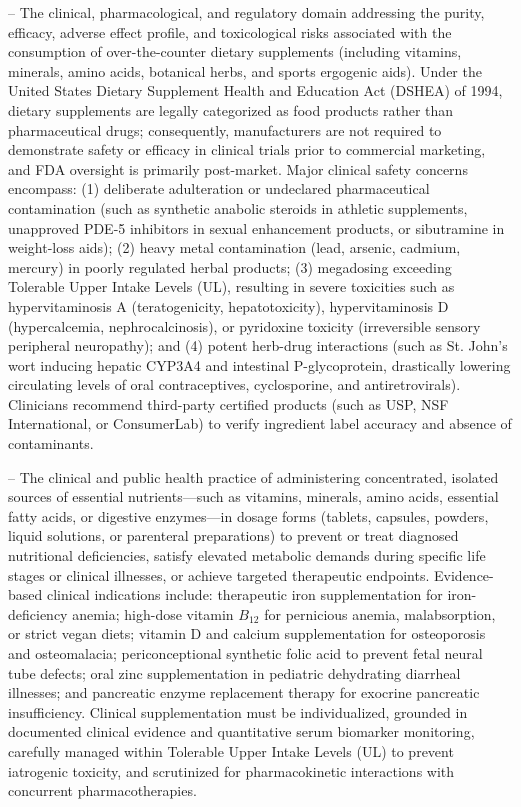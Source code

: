 -- The clinical, pharmacological, and regulatory domain addressing the purity, efficacy, adverse effect profile, and toxicological risks associated with the consumption of over-the-counter dietary supplements (including vitamins, minerals, amino acids, botanical herbs, and sports ergogenic aids). Under the United States Dietary Supplement Health and Education Act (DSHEA) of 1994, dietary supplements are legally categorized as food products rather than pharmaceutical drugs; consequently, manufacturers are not required to demonstrate safety or efficacy in clinical trials prior to commercial marketing, and FDA oversight is primarily post-market. Major clinical safety concerns encompass: (1) deliberate adulteration or undeclared pharmaceutical contamination (such as synthetic anabolic steroids in athletic supplements, unapproved PDE-5 inhibitors in sexual enhancement products, or sibutramine in weight-loss aids); (2) heavy metal contamination (lead, arsenic, cadmium, mercury) in poorly regulated herbal products; (3) megadosing exceeding Tolerable Upper Intake Levels (UL), resulting in severe toxicities such as hypervitaminosis A (teratogenicity, hepatotoxicity), hypervitaminosis D (hypercalcemia, nephrocalcinosis), or pyridoxine toxicity (irreversible sensory peripheral neuropathy); and (4) potent herb-drug interactions (such as St. John's wort inducing hepatic CYP3A4 and intestinal P-glycoprotein, drastically lowering circulating levels of oral contraceptives, cyclosporine, and antiretrovirals). Clinicians recommend third-party certified products (such as USP, NSF International, or ConsumerLab) to verify ingredient label accuracy and absence of contaminants.

-- The clinical and public health practice of administering concentrated, isolated sources of essential nutrients---such as vitamins, minerals, amino acids, essential fatty acids, or digestive enzymes---in dosage forms (tablets, capsules, powders, liquid solutions, or parenteral preparations) to prevent or treat diagnosed nutritional deficiencies, satisfy elevated metabolic demands during specific life stages or clinical illnesses, or achieve targeted therapeutic endpoints. Evidence-based clinical indications include: therapeutic iron supplementation for iron-deficiency anemia; high-dose vitamin $B_{12}$ for pernicious anemia, malabsorption, or strict vegan diets; vitamin D and calcium supplementation for osteoporosis and osteomalacia; periconceptional synthetic folic acid to prevent fetal neural tube defects; oral zinc supplementation in pediatric dehydrating diarrheal illnesses; and pancreatic enzyme replacement therapy for exocrine pancreatic insufficiency. Clinical supplementation must be individualized, grounded in documented clinical evidence and quantitative serum biomarker monitoring, carefully managed within Tolerable Upper Intake Levels (UL) to prevent iatrogenic toxicity, and scrutinized for pharmacokinetic interactions with concurrent pharmacotherapies.

